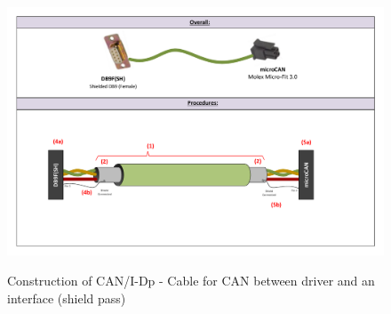 \begin{figure}
  \centering
  \includegraphics[angle=90,width=1\columnwidth]{figs/body03/FIGCANIDpconstruction.pdf}\\
  \caption[Construction of CAN/I-Dp - Cable for CAN between driver and an interface (shield pass)]{Construction of CAN/I-Dp - Cable for CAN between driver and an interface (shield pass)}
  \label{FIG:CANIDpconstruction}
\end{figure}

